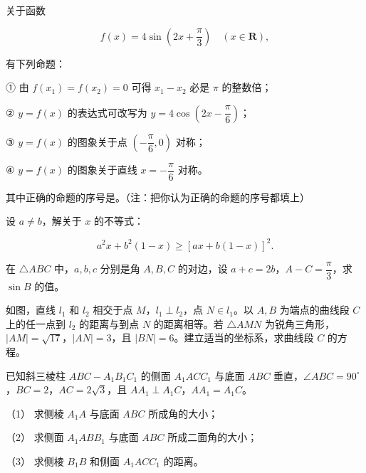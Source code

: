 \begin{question}
关于函数

\nopagebreak[4]
\[
f(x)=4\sin\left(2x+\frac\pi3\right)\quad (x\in\mathbf{R}),
\]

有下列命题：

① 由 $f(x_1)=f(x_2)=0$ 可得 $x_1-x_2$ 必是 $\pi$ 的整数倍；

② $y=f(x)$ 的表达式可改写为 $y=4\cos\left(2x-\dfrac\pi6\right)$；

③ $y=f(x)$ 的图象关于点 $\left(-\dfrac\pi6,0\right)$ 对称；

④ $y=f(x)$ 的图象关于直线 $x=-\dfrac\pi6$ 对称。

其中正确的命题的序号是\gkblank{}。（注：把你认为正确的命题的序号都填上）

\end{question}
\begin{question}
设 $a\ne b$，解关于 $x$ 的不等式：

\nopagebreak[4]
\[
a^2x+b^2(1-x)\ge [ax+b(1-x)]^2.
\]

\end{question}
\begin{question}
在 $\triangle ABC$ 中，$a,b,c$ 分别是角 $A,B,C$ 的对边，设 $a+c=2b$，$A-C=\dfrac\pi3$，求 $\sin B$ 的值。

\Needspace{0.4\textheight}
\end{question}
\begin{question}
如图，直线 $l_1$ 和 $l_2$ 相交于点 $M$，$l_1\perp l_2$，点 $N\in l_1$。以 $A,B$ 为端点的曲线段 $C$ 上的任一点到 $l_2$ 的距离与到点 $N$ 的距离相等。若 $\triangle AMN$ 为锐角三角形，$|AM|=\sqrt{17}$，$|AN|=3$，且 $|BN|=6$。建立适当的坐标系，求曲线段 $C$ 的方程。
\nopagebreak[4]
\begin{center}\end{center}
\nopagebreak[4]
\Needspace{0.4\textheight}
\end{question}
\begin{question}
已知斜三棱柱 $ABC-A_1B_1C_1$ 的侧面 $A_1ACC_1$ 与底面 $ABC$ 垂直，$\angle ABC=90^\circ$，$BC=2$，$AC=2\sqrt3$，且 $AA_1\perp A_1C$，$AA_1=A_1C$。

（1） 求侧棱 $A_1A$ 与底面 $ABC$ 所成角的大小；

（2） 求侧面 $A_1ABB_1$ 与底面 $ABC$ 所成二面角的大小；

（3） 求侧棱 $B_1B$ 和侧面 $A_1ACC_1$ 的距离。
\nopagebreak[4]
\begin{center}\end{center}
\nopagebreak[4]
\Needspace{0.4\textheight}
\end{question}
